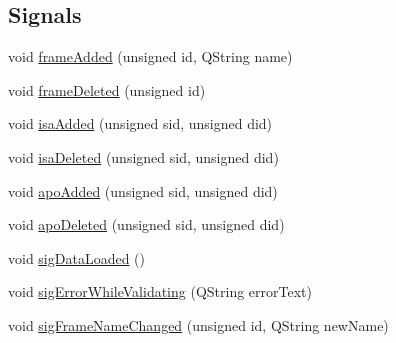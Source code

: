 \subsection*{Signals}
\begin{DoxyCompactItemize}
\item 
void \hyperlink{class_n_k_b_manager_ac6e48921e37b234b3d2dc915f14cfb49}{frameAdded} (unsigned id, QString name)
\item 
void \hyperlink{class_n_k_b_manager_a28db8e912575f958c549fb7d6295e09e}{frameDeleted} (unsigned id)
\item 
void \hyperlink{class_n_k_b_manager_a63494c7a5cc5fc242c05e69462d021e0}{isaAdded} (unsigned sid, unsigned did)
\item 
void \hyperlink{class_n_k_b_manager_aafbc1c4ae1ed589c71351e581288f365}{isaDeleted} (unsigned sid, unsigned did)
\item 
void \hyperlink{class_n_k_b_manager_a15f2a89fd99b905e3974d6ae0f159d96}{apoAdded} (unsigned sid, unsigned did)
\item 
void \hyperlink{class_n_k_b_manager_aabadb4a9203142f8d6196920a45b63a6}{apoDeleted} (unsigned sid, unsigned did)
\item 
void \hyperlink{class_n_k_b_manager_a6096343041741b63556288d2c1828ff7}{sigDataLoaded} ()
\item 
void \hyperlink{class_n_k_b_manager_ac49a07b739df7a3a5a2d6fc88a37fcd4}{sigErrorWhileValidating} (QString errorText)
\item 
void \hyperlink{class_n_k_b_manager_aa17a0d42f5fc86302aa53d14ece4fff0}{sigFrameNameChanged} (unsigned id, QString newName)
\end{DoxyCompactItemize}
